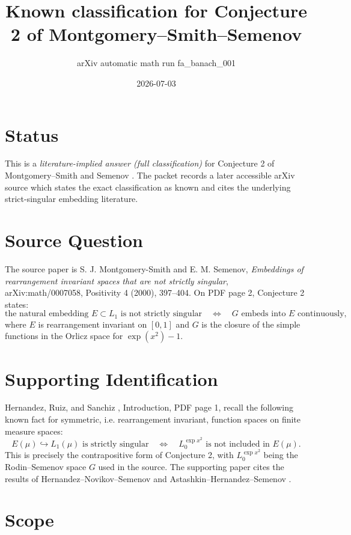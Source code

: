 \documentclass[11pt]{article}
\title{Known classification for Conjecture 2 of Montgomery--Smith--Semenov}
\author{arXiv automatic math run fa\_banach\_001}
\date{2026-07-03}
\begin{document}
\maketitle

\section*{Status}

This is a \emph{literature-implied answer (full classification)} for
Conjecture 2 of Montgomery--Smith and Semenov \cite{mss0007058}. The packet
records a later accessible arXiv source which states the exact classification
as known and cites the underlying strict-singular embedding literature.

\section*{Source Question}

The source paper is S. J. Montgomery-Smith and E. M. Semenov,
\emph{Embeddings of rearrangement invariant spaces that are not strictly
singular}, arXiv:math/0007058, Positivity 4 (2000), 397--404. On PDF page 2,
Conjecture 2 states:
\[
\text{the natural embedding }E\subset L_1\text{ is not strictly singular}
\quad\Longleftrightarrow\quad
G\text{ embeds into }E\text{ continuously},
\]
where \(E\) is rearrangement invariant on \([0,1]\) and \(G\) is the closure
of the simple functions in the Orlicz space for \(\exp(x^2)-1\).

\section*{Supporting Identification}

Hernandez, Ruiz, and Sanchiz \cite{hrs2406}, Introduction, PDF page 1, recall
the following known fact for symmetric, i.e. rearrangement invariant, function
spaces on finite measure spaces:
\[
E(\mu)\hookrightarrow L_1(\mu)\text{ is strictly singular}
\quad\Longleftrightarrow\quad
L^{\exp x^2}_0\text{ is not included in }E(\mu).
\]
This is precisely the contrapositive form of Conjecture 2, with
\(L^{\exp x^2}_0\) being the Rodin--Semenov space \(G\) used in the source.
The supporting paper cites the results of Hernandez--Novikov--Semenov
\cite{hns2003} and Astashkin--Hernandez--Semenov \cite{ahs2009}.

\section*{Scope}
\end{document}
